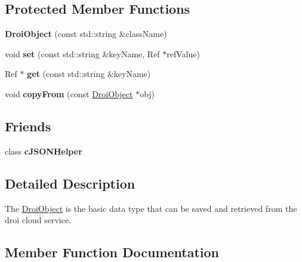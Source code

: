 \subsection*{Protected Member Functions}
\begin{DoxyCompactItemize}
\item 
\mbox{\label{class_droi_object_a9e11e78d649f5c59aa5211d9907eda66}} 
{\bfseries Droi\+Object} (const std\+::string \&class\+Name)
\item 
\mbox{\label{class_droi_object_a71125e4be43f074b7f82f3ea33df9a1c}} 
void {\bfseries set} (const std\+::string \&key\+Name, Ref $\ast$ref\+Value)
\item 
\mbox{\label{class_droi_object_ae38d96e55ea12405d4bc7183cc6c1c4d}} 
Ref $\ast$ {\bfseries get} (const std\+::string \&key\+Name)
\item 
\mbox{\label{class_droi_object_aa5513f4e8de56a2418dea1c2932ed68a}} 
void {\bfseries copy\+From} (const \hyperlink{class_droi_object}{Droi\+Object} $\ast$obj)
\end{DoxyCompactItemize}
\subsection*{Friends}
\begin{DoxyCompactItemize}
\item 
\mbox{\label{class_droi_object_a4c65f8b6629f95a05e4015663a0ba20a}} 
class {\bfseries c\+J\+S\+O\+N\+Helper}
\end{DoxyCompactItemize}


\subsection{Detailed Description}
The \hyperlink{class_droi_object}{Droi\+Object} is the basic data type that can be saved and retrieved from the droi cloud service. 

\subsection{Member Function Documentation}
\mbox{\label{class_droi_object_a352b0f8d9994eccf3c104460f2329d65}} 
